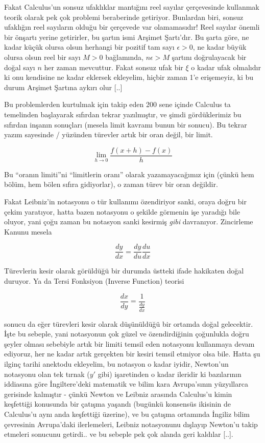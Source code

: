 \documentclass[12pt,fleqn]{article}\usepackage{../../common}
\begin{document}
Fakat Calculus'un sonsuz ufaklıklar mantığını reel sayılar çerçevesinde
kullanmak teorik olarak pek çok problemi beraberinde getiriyor. Bunlardan
biri, sonsuz ufaklığın reel sayıların olduğu bir çerçevede var
olamamasıdır! Reel sayılar önemli bir önşartı yerine getirirler, bu şartın
ismi Arşimet Şartı'dır. Bu şarta göre, ne kadar küçük olursa olsun herhangi
bir pozitif tam sayı $\epsilon > 0$, ne kadar büyük olursa olsun reel bir
sayı $M>0$ bağlamında, $n\epsilon > M$ şartını doğrulayacak bir doğal sayı
$n$ her zaman mevcuttur. Fakat sonsuz ufak bir $\xi$ o kadar ufak olmalıdır
ki onu kendisine ne kadar eklersek ekleyelim, hiçbir zaman 1'e erişemeyiz,
ki bu durum Arşimet Şartına aykırı olur [..]

Bu problemlerden kurtulmak için takip eden 200 sene içinde Calculus ta
temelinden başlayarak sıfırdan tekrar yazılmıştır, ve şimdi gördüklerimiz
bu sıfırdan inşanın sonuçları (mesela limit kavramı bunun bir sonucu). Bu
tekrar yazım sayesinde / yüzünden türevler artık bir oran değil, bir limit.

$$ \lim_{h \to 0} \frac{f(x+h) - f(x)}{h}$$

Bu ``oranın limiti''ni ``limitlerin oranı'' olarak yazamayacağımız için
(çünkü hem bölüm, hem bölen sıfıra gidiyorlar), o zaman türev bir oran
değildir.

Fakat Leibniz'in notasyonu o tür kullanımı özendiriyor sanki, oraya doğru bir
çekim yaratıyor, hatta bazen notasyonu o şekilde görmenin işe yaradığı bile
oluyor, yani çoğu zaman bu notasyon sanki kesirmiş {\em gibi}
davranıyor. Zincirleme Kanunu mesela

$$ \frac{dy}{dx} = \frac{dy}{du}\frac{du}{dx} $$

Türevlerin kesir olarak görüldüğü bir durumda üstteki ifade hakikaten doğal
duruyor. Ya da Tersi Fonksiyon (Inverse Function) teorisi

$$ \frac{dx}{dy} = \frac{1}{\frac{dy}{dx}} $$

sonucu da eğer türevleri kesir olarak düşünüldüğü bir ortamda doğal
gelecektir. İşte bu sebeple, yani notasyonun çok güzel ve özendirdiğinin
çoğunlukla doğru şeyler olması sebebiyle artık bir limiti temsil eden
notasyonu kullanmaya devam ediyoruz, her ne kadar artık gerçekten bir
kesiri temsil etmiyor olsa bile. Hatta şu ilginç tarihi anektodu ekleyelim,
bu notasyon o kadar iyidir, Newton'un notasyonu olan tek tırnak ($y'$ gibi)
işaretinden o kadar ileridir ki bazılarının iddiasına göre İngiltere'deki
matematik ve bilim kara Avrupa'sının yüzyıllarca gerisinde kalmıştır -
çünkü Newton ve Leibniz arasında Calculus'u kimin keşfettiği konusunda bir
çatışma yaşandı (bugünkü konsensüs ikisinin de Calculus'u aynı anda
keşfettiği üzerine), ve bu çatışma ortamında İngiliz bilim çevresinin
Avrupa'daki ilerlemeleri, Leibniz notasyonunu dışlayıp Newton'u takip
etmeleri sonucunu getirdi.. ve bu sebeple pek çok alanda geri kaldılar
[..].
\end{document}
